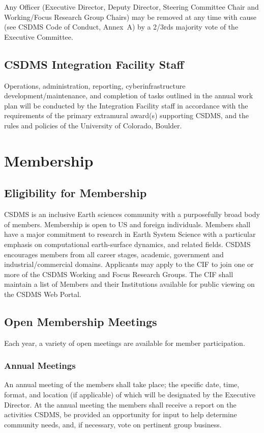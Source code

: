 \documentclass[11pt, oneside]{article}   	%
\def\article#1{
\renewcommand{\thesection}{Article \Roman{section}} 
\section[Article]{#1}
\renewcommand{\thesection}{\Roman{section}} 
}
\begin{document}
Any Officer (Executive Director, Deputy Director, Steering Committee Chair and Working/Focus Research Group Chairs) may be removed at any time with cause (see CSDMS Code of Conduct, Annex~A) by a 2/3rds majority vote of the Executive Committee.


\subsection{CSDMS Integration Facility Staff}

Operations, administration, reporting, cyberinfrastructure development/maintenance, and completion of tasks outlined in the annual work plan will be conducted by the Integration Facility staff in accordance with the requirements of the primary extramural award(s) supporting CSDMS, and the rules and policies of the University of Colorado, Boulder.


\article{Membership}


\subsection{Eligibility for Membership}

CSDMS is an inclusive Earth sciences community with a purposefully broad body of members. Membership is open to US and foreign individuals. Members shall have a major commitment to research in Earth System Science with a particular emphasis on computational earth-surface dynamics, and related fields. CSDMS encourages members from all career stages, academic, government and industrial/commercial domains. Applicants may apply to the CIF to join one or more of the CSDMS Working and Focus Research Groups. The CIF shall maintain a list of Members and their Institutions available for public viewing on the CSDMS Web Portal.


\subsection{Open Membership Meetings} Each year, a variety of open meetings are available for member participation.

\subsubsection{Annual Meetings} 

An annual meeting of the members shall take place; the specific date, time, format, and location (if applicable) of which will be designated by the Executive Director.  At the annual meeting the members shall receive a report on the activities CSDMS, be provided an opportunity for input to help determine community needs, and, if necessary, vote on pertinent group business.
\end{document}
